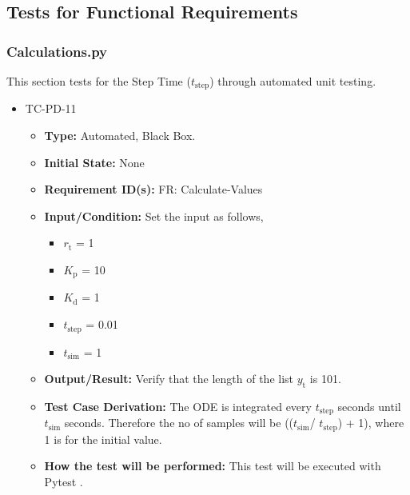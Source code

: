 \documentclass[12pt, titlepage]{article}
\begin{document}
\subsection{Tests for Functional Requirements}


\subsubsection{Calculations.py}


This section tests for the Step Time (${t_{\text{step}}}$) through automated unit testing.

\begin{itemize}
\item{TC-PD-11\\}
\begin{itemize}

\item{\textbf{Type:}}  Automated, Black Box.
					
\item{\textbf{Initial State:}} None

\item{\textbf{Requirement ID(s):}}  FR: Calculate-Values
					
\item{\textbf{Input/Condition:}}  Set the input as follows,

\begin{itemize}
\item ${r_{\text{t}}}$ = 1
\item ${K_{\text{p}}}$ = 10
\item ${K_{\text{d}}}$ = 1
\item ${t_{\text{step}}}$ = 0.01
\item ${t_{\text{sim}}}$ = 1 
\end{itemize}

\item{\textbf{Output/Result:}} Verify that the length of the list ${y_{\text{t}}}$ is 101.

\item{\textbf{Test Case Derivation:}} The ODE is integrated every  ${t_{\text{step}}}$ seconds 
until  ${t_{\text{sim}}}$ seconds. Therefore the no of samples will be  
((${t_{\text{sim}}}$/ ${t_{\text{step}}}$) + 1), where 1 is for the initial value.

\item{\textbf{How the test will be performed:}}  This test will be executed with Pytest \cite{Pytest}.

\end{itemize}
\end{itemize}
\end{document}
